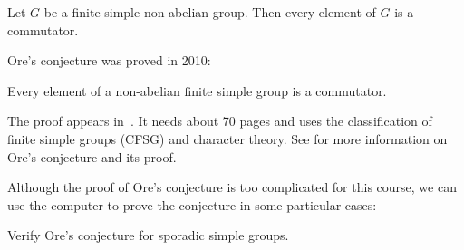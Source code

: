 \begin{conjecture}[Ore]
\label{conjecture:Ore}
    Let $G$ be a finite simple non-abelian group. 
    Then every element of $G$ is a commutator. 
\end{conjecture}

Ore's conjecture was proved in 2010:

\begin{theorem}
    Every element of a non-abelian finite simple group is a commutator.     
\end{theorem}

The proof appears in~\cite{MR2654085}. It needs about 70 pages and
uses the classification of finite simple groups (CFSG) and character theory.
See \cite{MR3289286} for more information on Ore's conjecture and its proof. 

Although the proof of Ore's conjecture is too complicated for 
this course, we can use the computer to 
prove the conjecture in some particular cases:

\begin{bonus}
    Verify Ore's conjecture  
    for sporadic simple groups.    
\end{bonus}








